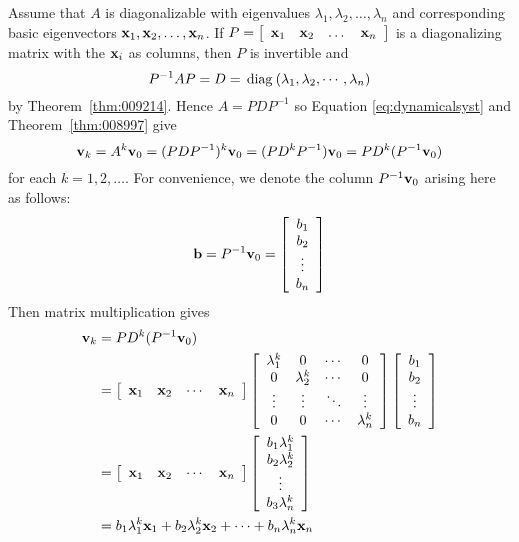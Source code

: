 Assume that $A$ is diagonalizable with eigenvalues $\lambda_{1}, \lambda_{2}, \dots ,  \lambda_{n}$ and corresponding basic eigenvectors $\textbf{x}_{1}, \textbf{x}_{2}, \dots , \textbf{x}_{n}$. If $P = \left[ \begin{array}{cccc} \textbf{x}_{1} & \textbf{x}_{2} & \dots  & \textbf{x}_{n} \end{array}\right]$  is a diagonalizing matrix with the $\textbf{x}_{i}$ as columns, then $P$ is invertible and
\begin{equation*}
P^{-1}AP=D = \thinspace\operatorname{diag\medspace}(\lambda_1, \lambda_2, \cdots, \lambda_n)
\end{equation*}
by Theorem~\ref{thm:009214}. Hence $A = PDP^{-1}$ so Equation \ref{eq:dynamicalsyst} and Theorem~\ref{thm:008997} give
\begin{equation*}
\textbf{v}_k = A^k \textbf{v}_0 = (PDP^{-1})^k \textbf{v}_0 = (PD^kP^{-1}) \textbf{v}_0 = PD^k (P^{-1}\textbf{v}_0)
\end{equation*}
for each $k = 1, 2, \dots$. For convenience, we denote the column $P^{-1}\textbf{v}_{0}$ arising here as follows:
\begin{equation*}
\textbf{b} = P^{-1} \textbf{v}_0 = \left[ \begin{array}{c}
b_1 \\
b_2 \\
\vdots \\
b_n 
\end{array} \right]
\end{equation*}
Then matrix multiplication gives
\begin{align}
\textbf{v}_k & = PD^k (P^{-1} \textbf{v}_0) \nonumber\\
 & = \left[ \begin{array}{cccc}
\textbf{x}_1 & \textbf{x}_2 & \cdots & \textbf{x}_n 
\end{array} \right]  
\left[ \begin{array}{cccc}
\lambda_1^k & 0 & \cdots & 0 \\
0 & \lambda_2^k & \cdots & 0 \\
\vdots & \vdots & \ddots & \vdots \\
0 & 0 & \cdots & \lambda_n^k
\end{array}\right] 
\left[ 
\begin{array}{c}
b_1 \\
b_2 \\
\vdots \\
b_n 
\end{array}\right] \nonumber\\
&=  \left[ \begin{array}{cccc}
\textbf{x}_1 & \textbf{x}_2 & \cdots & \textbf{x}_n 
\end{array} \right] \left[ \begin{array}{c}
b_1 \lambda_1^k \\
b_2 \lambda_2^k \\
\vdots \\
b_3 \lambda_n^k 
\end{array} \right] \nonumber\\
&= b_1 \lambda_1^k \textbf{x}_1 + b_2 \lambda_2^k \textbf{x}_2 + \cdots + b_n \lambda_n^k \textbf{x}_n  \label{eq:vkformula}
\end{align}

